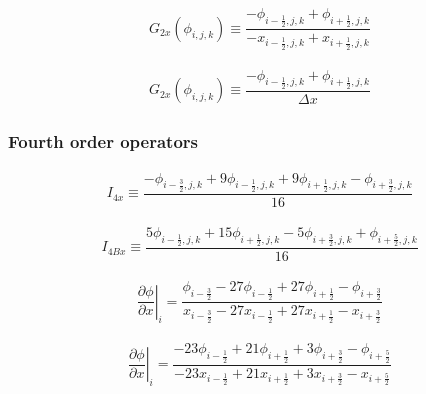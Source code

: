 \documentclass[gmd]{copernicus}
\begin{document}
\begin{eqnarray}
G_{2x} \left( \phi_{i,j,k} \right) \equiv \dfrac{- \phi_{i-\frac{1}{2},j,k} + \phi_{i+\frac{1}{2},j,k}}
                                                {-    x_{i-\frac{1}{2},j,k} +    x_{i+\frac{1}{2},j,k}}
\end{eqnarray}

\begin{eqnarray}
G_{2x} \left( \phi_{i,j,k} \right) \equiv \dfrac{- \phi_{i-\frac{1}{2},j,k} + \phi_{i+\frac{1}{2},j,k}}
                                                {\Delta x}
\end{eqnarray}

\subsubsection{Fourth order operators}

\begin{eqnarray}
I_{4x} \equiv \dfrac{- \phi_{i-\frac{3}{2},j,k} + 9 \phi_{i-\frac{1}{2},j,k} + 9 \phi_{i+\frac{1}{2},j,k} - \phi_{i+\frac{3}{2},j,k}}{16}
\end{eqnarray}

\begin{eqnarray}
I_{4Bx} \equiv \dfrac{ 5 \phi_{i-\frac{1}{2},j,k} + 15 \phi_{i+\frac{1}{2},j,k} - 5 \phi_{i+\frac{3}{2},j,k} + \phi_{i+\frac{5}{2},j,k}}{16}
\end{eqnarray}

\begin{eqnarray}
\left. \dfrac{\partial \phi}{\partial x}\right|_i = \dfrac{\phi_{i-\frac{3}{2}} - 27 \phi_{i-\frac{1}{2}} + 27 \phi_{i+\frac{1}{2}} - \phi_{i+\frac{3}{2}}}
                                                          {   x_{i-\frac{3}{2}} - 27    x_{i-\frac{1}{2}} + 27    x_{i+\frac{1}{2}} -    x_{i+\frac{3}{2}}}
\end{eqnarray}

\begin{eqnarray}
\left. \dfrac{\partial \phi}{\partial x}\right|_i = \dfrac{-23 \phi_{i-\frac{1}{2}} + 21 \phi_{i+\frac{1}{2}} + 3 \phi_{i+\frac{3}{2}} - \phi_{i+\frac{5}{2}}}
                                                          {-23    x_{i-\frac{1}{2}} + 21    x_{i+\frac{1}{2}} + 3    x_{i+\frac{3}{2}} -    x_{i+\frac{5}{2}}}
\end{eqnarray}
\end{document}
